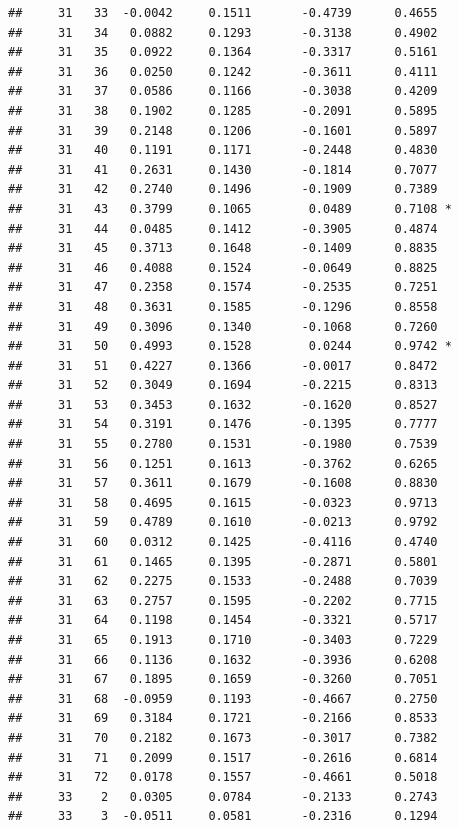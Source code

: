 \documentclass[
]{article}
\begin{document}
\begin{verbatim}
##     31   33  -0.0042     0.1511       -0.4739      0.4655  
##     31   34   0.0882     0.1293       -0.3138      0.4902  
##     31   35   0.0922     0.1364       -0.3317      0.5161  
##     31   36   0.0250     0.1242       -0.3611      0.4111  
##     31   37   0.0586     0.1166       -0.3038      0.4209  
##     31   38   0.1902     0.1285       -0.2091      0.5895  
##     31   39   0.2148     0.1206       -0.1601      0.5897  
##     31   40   0.1191     0.1171       -0.2448      0.4830  
##     31   41   0.2631     0.1430       -0.1814      0.7077  
##     31   42   0.2740     0.1496       -0.1909      0.7389  
##     31   43   0.3799     0.1065        0.0489      0.7108 *
##     31   44   0.0485     0.1412       -0.3905      0.4874  
##     31   45   0.3713     0.1648       -0.1409      0.8835  
##     31   46   0.4088     0.1524       -0.0649      0.8825  
##     31   47   0.2358     0.1574       -0.2535      0.7251  
##     31   48   0.3631     0.1585       -0.1296      0.8558  
##     31   49   0.3096     0.1340       -0.1068      0.7260  
##     31   50   0.4993     0.1528        0.0244      0.9742 *
##     31   51   0.4227     0.1366       -0.0017      0.8472  
##     31   52   0.3049     0.1694       -0.2215      0.8313  
##     31   53   0.3453     0.1632       -0.1620      0.8527  
##     31   54   0.3191     0.1476       -0.1395      0.7777  
##     31   55   0.2780     0.1531       -0.1980      0.7539  
##     31   56   0.1251     0.1613       -0.3762      0.6265  
##     31   57   0.3611     0.1679       -0.1608      0.8830  
##     31   58   0.4695     0.1615       -0.0323      0.9713  
##     31   59   0.4789     0.1610       -0.0213      0.9792  
##     31   60   0.0312     0.1425       -0.4116      0.4740  
##     31   61   0.1465     0.1395       -0.2871      0.5801  
##     31   62   0.2275     0.1533       -0.2488      0.7039  
##     31   63   0.2757     0.1595       -0.2202      0.7715  
##     31   64   0.1198     0.1454       -0.3321      0.5717  
##     31   65   0.1913     0.1710       -0.3403      0.7229  
##     31   66   0.1136     0.1632       -0.3936      0.6208  
##     31   67   0.1895     0.1659       -0.3260      0.7051  
##     31   68  -0.0959     0.1193       -0.4667      0.2750  
##     31   69   0.3184     0.1721       -0.2166      0.8533  
##     31   70   0.2182     0.1673       -0.3017      0.7382  
##     31   71   0.2099     0.1517       -0.2616      0.6814  
##     31   72   0.0178     0.1557       -0.4661      0.5018  
##     33    2   0.0305     0.0784       -0.2133      0.2743  
##     33    3  -0.0511     0.0581       -0.2316      0.1294  

\end{verbatim}
\end{document}
